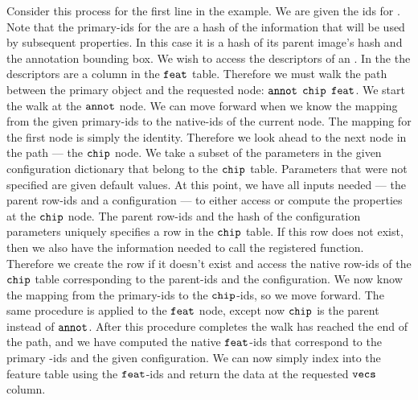         Consider this process for the first line in the example.
        We are given the ids for \annot{}.
        Note that the primary-ids for the \annots{} are a hash of the
          information that will be used by subsequent properties.
        In this case it is a hash of its parent image's hash and the
          annotation bounding box.
        We wish to access the descriptors of an \annot{}.
        In the \depcache{} the descriptors are a column in the $\tt{feat}$
          table.
        Therefore we must walk the path between the primary object and the
          requested node:
        $\tt{annot}$ \rarrow{} $\tt{chip}$ \rarrow{} $\tt{feat}$.
        We start the walk at the $\tt{annot}$ node.
        We can move forward when we know the mapping from the given
          primary-ids to the native-ids of the current node.
        The mapping for the first node is simply the identity.
        Therefore we look ahead to the next node in the path --- the
          $\tt{chip}$ node.
        We take a subset of the parameters in the given configuration
          dictionary that belong to the $\tt{chip}$ table.
        Parameters that were not specified are given default values.
        At this point, we have all inputs needed --- \ie{} the parent row-ids
          and a configuration --- to either access or compute the properties at
          the $\tt{chip}$ node.
        The parent row-ids and the hash of the configuration parameters
          uniquely specifies a row in the $\tt{chip}$ table.
        If this row does not exist, then we also have the information needed
          to call the registered function.
        Therefore we create the row if it doesn't exist and access the native
          row-ids of the $\tt{chip}$ table corresponding to the parent-ids and
          the configuration.
        We now know the mapping from the primary-ids to the $\tt{chip}$-ids,
          so we move forward.
        The same procedure is applied to the $\tt{feat}$ node, except now
          $\tt{chip}$ is the parent instead of $\tt{annot}$.
        After this procedure completes the walk has reached the end of the
          path, and we have computed the native $\tt{feat}$-ids that correspond
          to the primary \annot{}-ids and the given configuration.
        We can now simply index into the feature table using the
          $\tt{feat}$-ids and return the data at the requested $\tt{vecs}$
          column.

